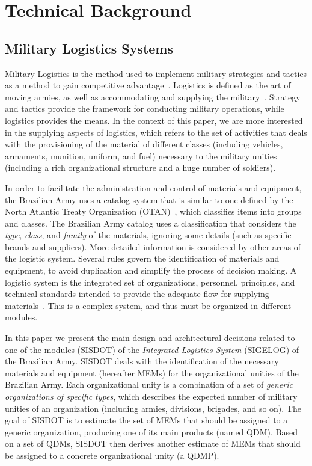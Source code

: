 \documentclass{bmcart}
\begin{document}
\section*{Technical Background}


\subsection*{Military Logistics Systems}
\label{sec:logistics}

Military Logistics is the method used to implement military strategies and tactics as a method to gain competitive advantage~\cite{rutner2012}. Logistics is defined as the art of moving armies, as well as accommodating and supplying the military~\cite{prebilic2006}. Strategy and tactics provide the framework for conducting military operations, while logistics provides the means. In the context of this paper, we are more interested in the supplying aspects of logistics, which refers to the set of activities that deals with the  provisioning of the material of different classes (including vehicles, armaments, munition, uniform, and fuel) necessary to the military unities (including a rich organizational structure and a huge number of soldiers). 

In order to facilitate the administration and control of materials and equipment, the Brazilian Army uses a catalog system that is similar to one defined by the North Atlantic Treaty Organization (OTAN)~\cite{otan2012}, which classifies items into groups and classes. The Brazilian Army catalog uses a classification that considers the \emph{type}, \emph{class}, and \emph{family} of the materials, ignoring some details (such as specific brands and suppliers). More detailed information is considered by other areas of the logistic system. Several rules govern the identification of materials and equipment, to avoid duplication and simplify the process of decision making. A logistic system is the integrated set of organizations, personnel, principles, and technical standards intended to provide the adequate flow for supplying materials~\cite{brasil2003}. This is a complex system, and thus must be organized in different modules. 

In this paper we present the main design and architectural decisions related to one of the modules (SISDOT) of the \emph{Integrated Logistics System} (SIGELOG) of the Brazilian Army. SISDOT deals with the identification of the necessary materials and equipment (hereafter MEMs) for the organizational unities of the Brazilian Army. Each organizational unity is a combination of a set of \emph{generic organizations of specific types}, which describes the expected number of military unities of an organization (including armies, divisions, brigades, and so on). The goal of SISDOT is to estimate the set of MEMs that should be assigned to a generic organization, producing one of its main products (named QDM). Based on a set of QDMs, SISDOT then derives another estimate of MEMs that should be assigned to a concrete organizational unity (a QDMP). 
\end{document}
